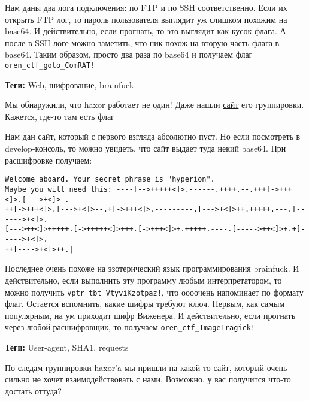 \documentclass[idxtotoc,hyperref,openany,oneside]{files/admin} %
\begin{document}
Нам даны два лога подключения: по FTP и по SSH соответственно. Если их открыть FTP лог, то пароль пользователя выглядит уж слишком похожим на base64. И действительно, если прогнать, то это выглядит как кусок флага. А после в SSH логе можно заметить, что ник похож на вторую часть флага в base64. Таким образом, просто два раза по base64 и получаем флаг \verb|oren_ctf_goto_ComRAT!|



\textbf{Теги:} Web, шифрование, brainfuck\vspace{\baselineskip}

\begin{tcolorbox}
Мы обнаружили, что haxor работает не один! Даже нашли \href{http://ctf-edu-t.orb.ru:1267}{сайт} его группировки. Кажется, где-то там есть флаг
\end{tcolorbox}

Нам дан сайт, который с первого взгляда абсолютно пуст. Но если посмотреть в develop-консоль, то можно увидеть, что сайт выдает туда некий base64. При расшифровке получаем:  \begin{verbatim}
Welcome aboard. Your secret phrase is "hyperion". 
Maybe you will need this: ----[-->+++++<]>.------.++++.--.+++[->+++<]>.[--->+<]>-.
++[->+++<]>.[--->+<]>--.+[->+++<]>.---------.[--->+<]>++.+++++.---.[------>+<]>.
[--->++<]>+++++.[->+++++<]>+++.[->+++<]>+.+++++.----.[----->++<]>+.+[----->+<]>.
++[---->+<]>++.|
\end{verbatim}

Последнее очень похоже на эзотерический язык программирования brainfuck. И действительно, если выполнить эту программу любым интерпретатором, то можно получить \verb|vptr_tbt_VtyviKzotpaz!|, что оооочень напоминает по формату флаг. Остается вспомнить, какие шифры требуют ключ. Первым, как самым популярным, на ум приходит шифр Виженера. И действительно, если прогнать через любой расшифровщик, то получаем \verb|oren_ctf_ImageTragick!|




\textbf{Теги:} User-agent, SHA1, requests\vspace{\baselineskip}

\begin{tcolorbox}
По следам группировки haxor'a мы пришли на какой-то \href{http://ctf-edu-t.orb.ru:1299}{сайт}, который очень сильно не хочет взаимодействовать с нами. Возможно, у вас получится что-то достать оттуда?
\end{tcolorbox}
\end{document}
